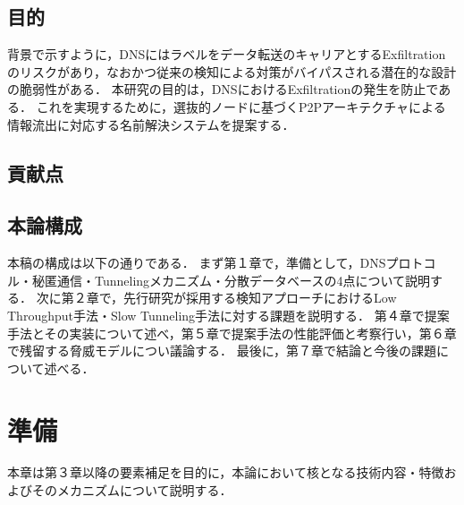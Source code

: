 \documentclass[12pt]{jarticle} %
\begin{document}
\subsection{目的}
背景で示すように，DNSにはラベルをデータ転送のキャリアとするExfiltrationのリスクがあり，なおかつ従来の検知による対策がバイパスされる潜在的な設計の脆弱性がある．
本研究の目的は，DNSにおけるExfiltrationの発生を防止である．
これを実現するために，選抜的ノードに基づくP2Pアーキテクチャによる情報流出に対応する名前解決システムを提案する．


\subsection{貢献点}




\subsection{本論構成}
本稿の構成は以下の通りである．
まず第１章で，準備として，DNSプロトコル・秘匿通信・Tunnelingメカニズム・分散データベースの4点について説明する．
次に第２章で，先行研究が採用する検知アプローチにおけるLow Throughput手法・Slow Tunneling手法に対する課題を説明する．
第４章で提案手法とその実装について述べ，第５章で提案手法の性能評価と考察行い，第６章で残留する脅威モデルについ議論する．
最後に，第７章で結論と今後の課題について述べる．



\newpage
\section{準備}
本章は第３章以降の要素補足を目的に，本論において核となる技術内容・特徴およびそのメカニズムについて説明する．
\end{document}
